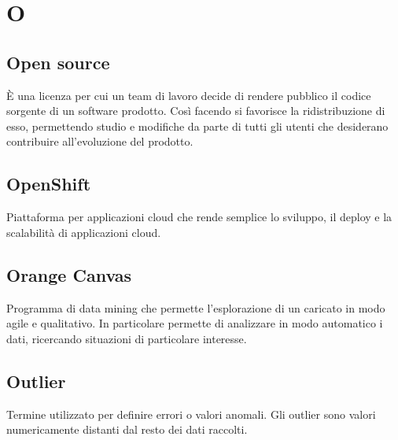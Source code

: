 \section*{O}
\markright{}

\subsection*{Open source}
È una licenza per cui un team di lavoro decide di rendere pubblico il codice sorgente di un software prodotto. Così facendo si favorisce la ridistribuzione di esso, permettendo studio e modifiche da parte di tutti gli utenti che desiderano contribuire all'evoluzione del prodotto.

\subsection*{OpenShift}
Piattaforma per applicazioni cloud che rende semplice lo sviluppo, il deploy e la scalabilità di applicazioni cloud.

\subsection*{Orange Canvas}
Programma di data mining  che permette l'esplorazione di un  caricato in modo agile e qualitativo. In particolare permette di analizzare in modo automatico i dati, ricercando situazioni di particolare interesse.

\subsection*{Outlier}
Termine utilizzato per definire errori o valori anomali. Gli outlier sono valori numericamente distanti dal resto dei dati raccolti.
